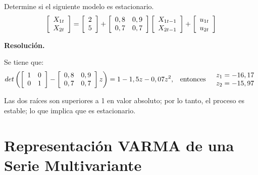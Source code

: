 \begin{ejemplo}
Determine si el siguiente modelo es estacionario.
\[
\left[ {\begin{array}{*{20}c}
X_{1t}\\
X_{2t}\\
\end{array} } \right]=\left[ {\begin{array}{*{20}c}
2\\
5\\
\end{array} } \right]+\left[ {\begin{array}{*{20}c}
0,8 & 0,9\\
0,7 & 0,7\\
\end{array} } \right]\left[ {\begin{array}{*{20}c}
X_{1t-1}\\
X_{2t-1}\\
\end{array} } \right]+\left[ {\begin{array}{*{20}c}
u_{1t}\\
u_{2t}\\
\end{array} } \right]
\]

\textbf{Resoluci\'{o}n.}

Se tiene que:
\[
det\left( \left[ {\begin{array}{*{20}c}
1 & 0\\
0 & 1\\
\end{array} } \right]-\left[ {\begin{array}{*{20}c}
0,8 & 0,9\\
0,7 & 0,7\\
\end{array} } \right]z \right)=1-1,5z-0,07z^{2}\text{,\quad entonces\quad}
{\begin{array}{*{20}c}
z_{1}=-16,17\\
z_{2}=-15,97\\
\end{array} }
\]

Las dos ra\'{i}ces son superiores a 1 en valor absoluto; por lo tanto, el proceso es estable; lo que implica que es estacionario.
\end{ejemplo}


\section{Representaci\'{o}n VARMA de una Serie Multivariante}
\label{subsec:representaci}

